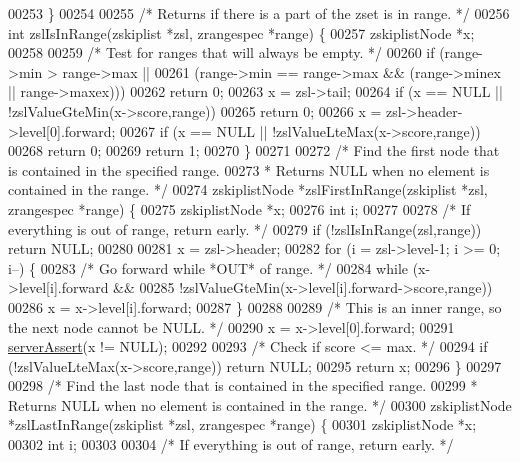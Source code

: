 \begin{DoxyCode}
00253 \}
00254 
00255 \textcolor{comment}{/* Returns if there is a part of the zset is in range. */}
00256 \textcolor{keywordtype}{int} zslIsInRange(zskiplist *zsl, zrangespec *range) \{
00257     zskiplistNode *x;
00258 
00259     \textcolor{comment}{/* Test for ranges that will always be empty. */}
00260     \textcolor{keywordflow}{if} (range->min > range->max ||
00261             (range->min == range->max && (range->minex || range->maxex)))
00262         \textcolor{keywordflow}{return} 0;
00263     x = zsl->tail;
00264     \textcolor{keywordflow}{if} (x == NULL || !zslValueGteMin(x->score,range))
00265         \textcolor{keywordflow}{return} 0;
00266     x = zsl->header->level[0].forward;
00267     \textcolor{keywordflow}{if} (x == NULL || !zslValueLteMax(x->score,range))
00268         \textcolor{keywordflow}{return} 0;
00269     \textcolor{keywordflow}{return} 1;
00270 \}
00271 
00272 \textcolor{comment}{/* Find the first node that is contained in the specified range.}
00273 \textcolor{comment}{ * Returns NULL when no element is contained in the range. */}
00274 zskiplistNode *zslFirstInRange(zskiplist *zsl, zrangespec *range) \{
00275     zskiplistNode *x;
00276     \textcolor{keywordtype}{int} i;
00277 
00278     \textcolor{comment}{/* If everything is out of range, return early. */}
00279     \textcolor{keywordflow}{if} (!zslIsInRange(zsl,range)) \textcolor{keywordflow}{return} NULL;
00280 
00281     x = zsl->header;
00282     \textcolor{keywordflow}{for} (i = zsl->level-1; i >= 0; i--) \{
00283         \textcolor{comment}{/* Go forward while *OUT* of range. */}
00284         \textcolor{keywordflow}{while} (x->level[i].forward &&
00285             !zslValueGteMin(x->level[i].forward->score,range))
00286                 x = x->level[i].forward;
00287     \}
00288 
00289     \textcolor{comment}{/* This is an inner range, so the next node cannot be NULL. */}
00290     x = x->level[0].forward;
00291     \hyperlink{server_8h_a88114b5169b4c382df6b56506285e56a}{serverAssert}(x != NULL);
00292 
00293     \textcolor{comment}{/* Check if score <= max. */}
00294     \textcolor{keywordflow}{if} (!zslValueLteMax(x->score,range)) \textcolor{keywordflow}{return} NULL;
00295     \textcolor{keywordflow}{return} x;
00296 \}
00297 
00298 \textcolor{comment}{/* Find the last node that is contained in the specified range.}
00299 \textcolor{comment}{ * Returns NULL when no element is contained in the range. */}
00300 zskiplistNode *zslLastInRange(zskiplist *zsl, zrangespec *range) \{
00301     zskiplistNode *x;
00302     \textcolor{keywordtype}{int} i;
00303 
00304     \textcolor{comment}{/* If everything is out of range, return early. */}

\end{DoxyCode}
